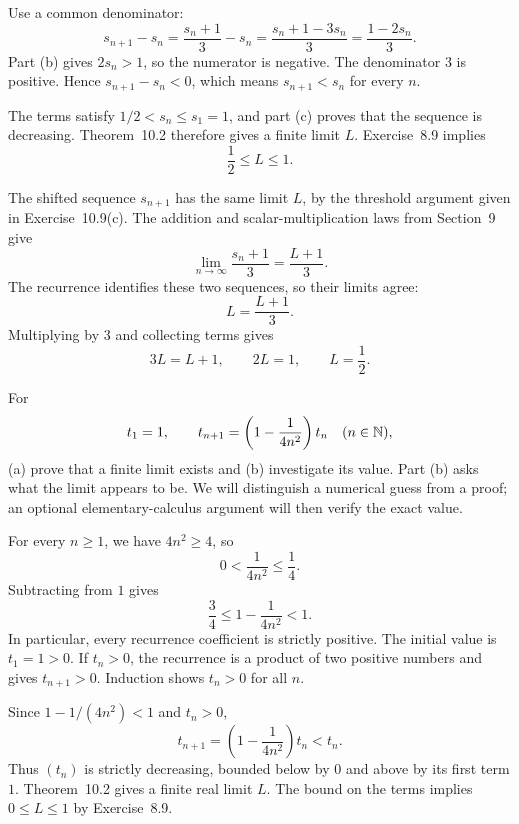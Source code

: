 
Use a common denominator:
\[
 s_{n+1}-s_n
 =\frac{s_n+1}{3}-s_n
 =\frac{s_n+1-3s_n}{3}
 =\frac{1-2s_n}{3}.
\]
Part (b) gives $2s_n>1$, so the numerator is negative.
The denominator $3$ is positive. Hence $s_{n+1}-s_n<0$,
which means $s_{n+1}<s_n$ for every $n$.


The terms satisfy $1/2<s_n\le s_1=1$, and part (c) proves that
the sequence is decreasing. Theorem~10.2 therefore gives a finite
limit $L$. Exercise~8.9 implies
\[
 \frac12\le L\le1.
\]

The shifted sequence $s_{n+1}$ has the same limit $L$, by the
threshold argument given in Exercise~10.9(c).
The addition and scalar-multiplication laws from Section~9 give
\[
 \lim_{n\to\infty}\frac{s_n+1}{3}=\frac{L+1}{3}.
\]
The recurrence identifies these two sequences, so their limits agree:
\[
 L=\frac{L+1}{3}.
\]
Multiplying by $3$ and collecting terms gives
\[
 3L=L+1,\qquad 2L=1,\qquad L=\frac12.
\]



\goal For
\[
 t_1=1,\qquad
 t_{n+1}=\left(1-\frac1{4n^2}\right)t_n\quad(n\in\mathbb{N}),
\]
(a) prove that a finite limit exists and (b) investigate its value.
Part (b) asks what the limit appears to be. We will distinguish
a numerical guess from a proof; an optional elementary-calculus
argument will then verify the exact value.

For every $n\ge1$, we have $4n^2\ge4$, so
\[
 0<\frac1{4n^2}\le\frac14.
\]
Subtracting from $1$ gives
\[
 \frac34\le1-\frac1{4n^2}<1.
\]
In particular, every recurrence coefficient is strictly positive.
The initial value is $t_1=1>0$. If $t_n>0$, the recurrence is a
product of two positive numbers and gives $t_{n+1}>0$.
Induction shows $t_n>0$ for all $n$.

Since $1-1/(4n^2)<1$ and $t_n>0$,
\[
 t_{n+1}=\left(1-\frac1{4n^2}\right)t_n<t_n.
\]
Thus $(t_n)$ is strictly decreasing, bounded below by $0$ and above
by its first term $1$. Theorem~10.2 gives a finite real limit $L$.
The bound on the terms implies $0\le L\le1$ by Exercise~8.9.

